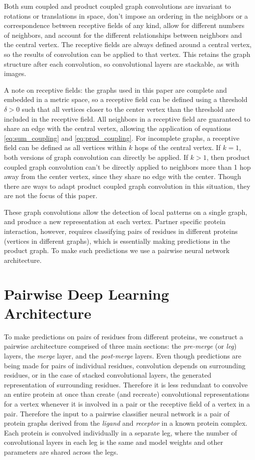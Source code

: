 Both sum coupled and product coupled graph convolutions are invariant to rotations or translations in space, don't impose an ordering in the neighbors or a correspondence between receptive fields of any kind, allow for different numbers of neighbors, and account for the different relationships between neighbors and the central vertex. 
The receptive fields are always defined around a central vertex, so the results of convolution can be applied to that vertex.
This retains the graph structure after each convolution, so convolutional layers are stackable, as with images.

A note on receptive fields: 
the graphs used in this paper are complete and embedded in a metric space, so a receptive field can be defined using a threshold $\delta>0$ such that all vertices closer to the center vertex than the threshold are included in the receptive field.
All neighbors in a receptive field are guaranteed to share an edge with the central vertex, allowing the application of equations \ref{eq:sum_coupling} and \ref{eq:prod_coupling}.
For incomplete graphs, a receptive field can be defined as all vertices within $k$ hops of the central vertex. 
If $k=1$, both versions of graph convolution can directly be applied.
If $k>1$, then product coupled graph convolution can't be directly applied to neighbors more than 1 hop away from the center vertex, since they share no edge with the center. 
Though there are ways to adapt product coupled graph convolution in this situation, they are not the focus of this paper.

These graph convolutions allow the detection of local patterns on a single graph, and produce a new representation at each vertex.
Partner specific protein interaction, however, requires classifying pairs of residues in different proteins (vertices in different graphs), which is essentially making predictions in the product graph. To make such predictions we use a pairwise neural network architecture.

\section{Pairwise Deep Learning Architecture}
To make predictions on pairs of residues from different proteins, we construct a pairwise architecture comprised of three main sections: the \textit{pre-merge} (or \textit{leg}) layers, the \textit{merge} layer, and the \textit{post-merge} layers. 
Even though predictions are being made for pairs of individual residues, convolution depends on surrounding residues, or in the case of stacked convolutional layers, the generated representation of surrounding residues.
Therefore it is less redundant to convolve an entire protein at once than create (and recreate) convolutional representations for a vertex whenever it is involved in a pair or the receptive field of a vertex in a pair.
Therefore the input to a pairwise classifier neural network is a pair of protein graphs derived from the \textit{ligand} and \textit{receptor} in a known protein complex.
Each protein is convolved individually in a separate leg, where the number of convolutional layers in each leg is the same and model weights and other parameters are shared across the legs.

